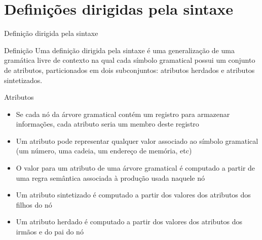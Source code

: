 \section{Definições dirigidas pela sintaxe}

\begin{frame}[fragile]{Definição dirigida pela sintaxe}

    \begin{block}{Definição}
        Uma definição dirigida pela sintaxe é uma generalização de uma gramática livre de contexto na qual cada símbolo gramatical
        possui um conjunto de atributos, particionados em dois subconjuntos: atributos herdados e atributos sintetizados.
    \end{block}

\end{frame}

\begin{frame}[fragile]{Atributos}

    \begin{itemize}
        \item Se cada nó da árvore gramatical contém um registro para armazenar informações, cada atributo seria um membro deste
            registro

        \item Um atributo pode representar qualquer valor associado ao símbolo gramatical (um número, uma cadeia, um endereço de memória,
            etc)

        \item O valor para um atributo de uma árvore gramatical é computado a partir de uma regra semântica associada à produção usada
            naquele nó

        \item Um atributo sintetizado é computado a partir dos valores dos atributos dos filhos do nó

        \item Um atributo herdado é computado a partir dos valores dos atributos dos irmãos e do pai do nó
    \end{itemize}

\end{frame}

